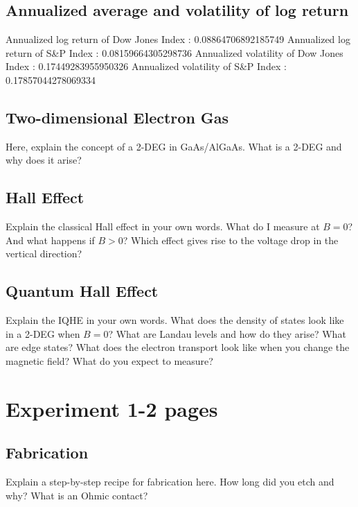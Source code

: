 \documentclass[a4paper]{article}
\begin{document}
\subsection{Annualized average and volatility of log return}
\begin{flushleft}
Annualized log return of Dow Jones Index : 0.08864706892185749 \linebreak 
Annualized log return of S\&P Index : 0.08159664305298736 \linebreak 
Annualized volatility of Dow Jones Index : 0.17449283955950326 \linebreak 
Annualized volatility of S\&P Index : 0.17857044278069334 \linebreak 
\end{flushleft}

\label{sec:theory}

\subsection{Two-dimensional Electron Gas}
Here, explain the concept of a 2-DEG in GaAs/AlGaAs. What is a 2-DEG and why does it arise?

\subsection{Hall Effect}
Explain the classical Hall effect in your own words. What do I measure at $B=0$? And what happens if $B>0$? Which effect gives rise to the voltage drop in the vertical direction?

\subsection{Quantum Hall Effect}
Explain the IQHE in your own words. What does the density of states look like in a 2-DEG when $B=0$? What are Landau levels and how do they arise? What are edge states? What does the electron transport look like when you change the magnetic field? What do you expect to measure?

\section{Experiment 1-2 pages}
\subsection{Fabrication}
Explain a step-by-step recipe for fabrication here. How long did you etch and why? What is an Ohmic contact?
\end{document}
